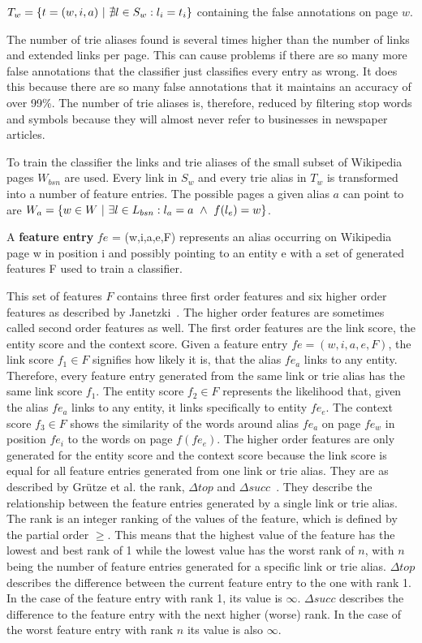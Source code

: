 $T_w = \{ t = (w,i,a) {\mbox{ }|\mbox{ }} \nexists l \in S_w: l_i = t_i \}$ containing the false annotations on page $w$.\par
The number of trie aliases found is several times higher than the number of links and extended links per page. This can cause problems if there are so many more false annotations that the classifier just classifies every entry as wrong. It does this because there are so many false annotations that it maintains an accuracy of over 99\%. The number of trie aliases is, therefore, reduced by filtering stop words and symbols because they will almost never refer to businesses in newspaper articles.\par
To train the classifier the links and trie aliases of the small subset of Wikipedia pages $W_{bsn}$ are used. Every link in $S_w$ and every trie alias in $T_w$ is transformed into a number of feature entries. The possible pages a given alias $a$ can point to are $W_a = \{ w \in W {\mbox{ }|\mbox{ }} \exists l \in L_{bsn}: l_a = a {\mbox{ }\wedge\mbox{ }} f(l_e) = w \}$.
\begin{definition}
A \textbf{feature entry} $fe$ = (w,i,a,e,F) represents an alias occurring on Wikipedia page w in position i and possibly pointing to an entity e with a set of generated features F used to train a classifier.
\label{featureentry}
\end{definition}
This set of features $F$ contains three first order features and six higher order features as described by Janetzki\ \cite{janetzki}. The higher order features are sometimes called second order features as well. The first order features are the link score, the entity score and the context score. Given a feature entry $fe = (w,i,a,e,F)$, the link score $f_1 \in F$ signifies how likely it is, that the alias $fe_a$ links to any entity. Therefore, every feature entry generated from the same link or trie alias has the same link score $f_1$. The entity score $f_2 \in F$ represents the likelihood that, given the alias $fe_a$ links to any entity, it links specifically to entity $fe_e$. The context score $f_3 \in F$ shows the similarity of the words around alias $fe_a$ on page $fe_w$ in position $fe_i$ to the words on page $f(fe_e)$. The higher order features are only generated for the entity score and the context score because the link score is equal for all feature entries generated from one link or trie alias. They are as described by Grütze et al. the rank, $\Delta top$ and $\Delta succ$\ \cite{coheel}. They describe the relationship between the feature entries generated by a single link or trie alias. The rank is an integer ranking of the values of the feature, which is defined by the partial order $\geq$. This means that the highest value of the feature has the lowest and best rank of 1 while the lowest value has the worst rank of $n$, with $n$ being the number of feature entries generated for a specific link or trie alias. $\Delta top$ describes the difference between the current feature entry to the one with rank 1. In the case of the feature entry with rank 1, its value is $\infty$. $\Delta succ$ describes the difference to the feature entry with the next higher (worse) rank. In the case of the worst feature entry with rank $n$ its value is also $\infty$.\par
